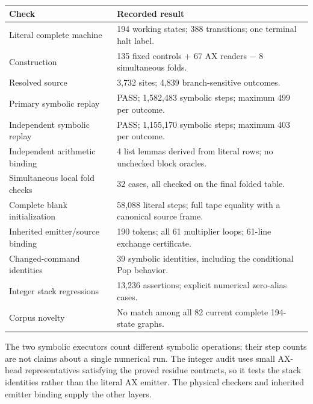 \begin{center}\small
\begin{tabularx}{\linewidth}{@{}lX@{}}
\toprule Check & Recorded result\\\midrule
Literal complete machine &194 working states; 388 transitions; one terminal halt label.\\
Construction &135 fixed controls + 67 AX readers $-$ 8 simultaneous folds.\\
Resolved source &3,732 sites; 4,839 branch-sensitive outcomes.\\
Primary symbolic replay &PASS; 1,582,483 symbolic steps; maximum 499 per outcome.\\
Independent symbolic replay &PASS; 1,155,170 symbolic steps; maximum 403 per outcome.\\
Independent arithmetic binding &4 list lemmas derived from literal rows; no unchecked block oracles.\\
Simultaneous local fold checks &32 cases, all checked on the final folded table.\\
Complete blank initialization &58,088 literal steps; full tape equality with a canonical source frame.\\
Inherited emitter/source binding &190 tokens; all 61 multiplier loops; 61-line exchange certificate.\\
Changed-command identities &39 symbolic identities, including the conditional Pop behavior.\\
Integer stack regressions &13,236 assertions; explicit numerical zero-alias cases.\\
Corpus novelty &No match among all 82 current complete 194-state graphs.\\
\bottomrule
\end{tabularx}
\end{center}
The two symbolic executors count different symbolic operations; their step
counts are not claims about a single numerical run. The integer audit uses
small AX-head representatives satisfying the proved residue contracts, so
it tests the stack identities rather than the literal AX emitter. The
physical checkers and inherited emitter binding supply the other layers.
